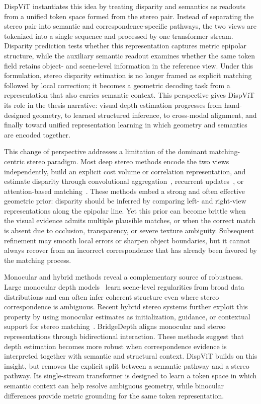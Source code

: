 DispViT instantiates this idea by treating disparity and semantics as readouts from a unified token space formed from the stereo pair.
Instead of separating the stereo pair into semantic and correspondence-specific pathways, the two views are tokenized into a single sequence and processed by one transformer stream.
Disparity prediction tests whether this representation captures metric epipolar structure, while the auxiliary semantic readout examines whether the same token field retains object- and scene-level information in the reference view.
Under this formulation, stereo disparity estimation is no longer framed as explicit matching followed by local correction; it becomes a geometric decoding task from a representation that also carries semantic context.
This perspective gives DispViT its role in the thesis narrative: visual depth estimation progresses from hand-designed geometry, to learned structured inference, to cross-modal alignment, and finally toward unified representation learning in which geometry and semantics are encoded together.

This change of perspective addresses a limitation of the dominant matching-centric stereo paradigm.
Most deep stereo methods encode the two views independently, build an explicit cost volume or correlation representation, and estimate disparity through convolutional aggregation~\cite{kendall2017end}, recurrent updates~\cite{lipson2021raft,xu2023iterative,wang2024selective}, or attention-based matching~\cite{li2021revisiting}.
These methods embed a strong and often effective geometric prior: disparity should be inferred by comparing left- and right-view representations along the epipolar line.
Yet this prior can become brittle when the visual evidence admits multiple plausible matches, or when the correct match is absent due to occlusion, transparency, or severe texture ambiguity.
Subsequent refinement may smooth local errors or sharpen object boundaries, but it cannot always recover from an incorrect correspondence that has already been favored by the matching process.

Monocular and hybrid methods reveal a complementary source of robustness.
Large monocular depth models~\cite{ranftl2020towards,depth_anything_v1,yang2024depth,piccinelli2024unidepth} learn scene-level regularities from broad data distributions and can often infer coherent structure even where stereo correspondence is ambiguous.
Recent hybrid stereo systems further exploit this property by using monocular estimates as initialization, guidance, or contextual support for stereo matching~\cite{cheng2025monster,jiang2025defom}.
BridgeDepth aligns monocular and stereo representations through bidirectional interaction.
These methods suggest that depth estimation becomes more robust when correspondence evidence is interpreted together with semantic and structural context.
DispViT builds on this insight, but removes the explicit split between a semantic pathway and a stereo pathway.
Its single-stream transformer is designed to learn a token space in which semantic context can help resolve ambiguous geometry, while binocular differences provide metric grounding for the same token representation.

